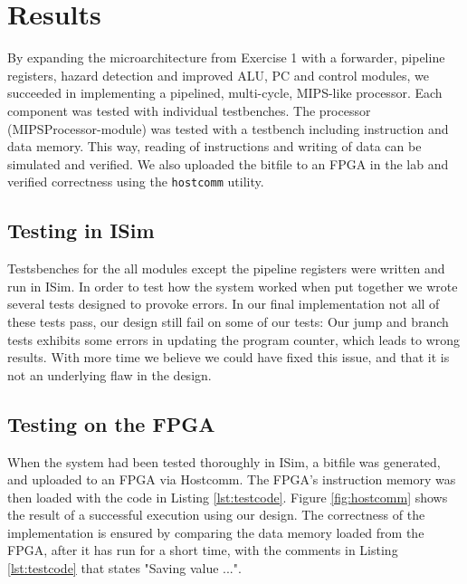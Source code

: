 \chapter{Results}

By expanding the microarchitecture from Exercise 1 \cite{compendium} with a forwarder, pipeline registers, hazard detection and improved ALU, PC and control modules, we succeeded in implementing a pipelined, multi-cycle, MIPS-like processor.
Each component was tested with individual testbenches.
The processor (MIPSProcessor-module) was tested with a testbench including instruction and data memory.
This way, reading of instructions and writing of data can be simulated and verified.
We also uploaded the bitfile to an FPGA in the lab and verified correctness using the \texttt{hostcomm} utility.

\section{Testing in ISim}
Testsbenches for the all modules except the pipeline registers were written and run in ISim. 
In order to test how the system worked when put together we wrote several tests designed to provoke errors. 
In our final implementation not all of these tests pass, our design still fail on some of our tests:
Our jump and branch tests exhibits some errors in updating the program counter, which leads to wrong results.
With more time we believe we could have fixed this issue, and that it is not an underlying flaw in the design.

\section{Testing on the FPGA}
When the system had been tested thoroughly in ISim, a bitfile was generated, and uploaded to an FPGA via Hostcomm.
The FPGA's instruction memory was then loaded with the code in Listing \ref{lst:testcode}.
Figure \ref{fig:hostcomm} shows the result of a successful execution using our design.
The correctness of the implementation is ensured by comparing the data memory loaded from the FPGA, after it has run for a short time, with the comments in Listing \ref{lst:testcode} that states "Saving value ...".

